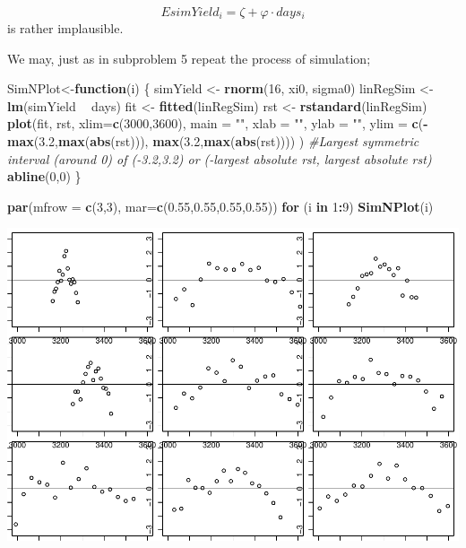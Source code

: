 \documentclass[
]{article}
\newenvironment{Shaded}{\begin{snugshade}}{\end{snugshade}}
\newcommand{\CommentTok}[1]{\textcolor[rgb]{0.56,0.35,0.01}{\textit{#1}}}
\newcommand{\ControlFlowTok}[1]{\textcolor[rgb]{0.13,0.29,0.53}{\textbf{#1}}}
\newcommand{\DataTypeTok}[1]{\textcolor[rgb]{0.13,0.29,0.53}{#1}}
\newcommand{\DecValTok}[1]{\textcolor[rgb]{0.00,0.00,0.81}{#1}}
\newcommand{\FloatTok}[1]{\textcolor[rgb]{0.00,0.00,0.81}{#1}}
\newcommand{\KeywordTok}[1]{\textcolor[rgb]{0.13,0.29,0.53}{\textbf{#1}}}
\newcommand{\NormalTok}[1]{#1}
\newcommand{\OperatorTok}[1]{\textcolor[rgb]{0.81,0.36,0.00}{\textbf{#1}}}
\newcommand{\StringTok}[1]{\textcolor[rgb]{0.31,0.60,0.02}{#1}}
\begin{document}
\[
EsimYield_i=\zeta+\varphi\cdot days_i
\] is rather implausible.

We may, just as in subproblem 5 repeat the process of simulation;

\begin{Shaded}
\begin{Highlighting}[]
\NormalTok{SimNPlot<-}\ControlFlowTok{function}\NormalTok{(i) \{}
\NormalTok{   simYield <-}\StringTok{ }\KeywordTok{rnorm}\NormalTok{(}\DecValTok{16}\NormalTok{, xi0, sigma0)}
\NormalTok{   linRegSim <-}\StringTok{ }\KeywordTok{lm}\NormalTok{(simYield }\OperatorTok{~}\StringTok{ }\NormalTok{days)}
\NormalTok{   fit <-}\StringTok{ }\KeywordTok{fitted}\NormalTok{(linRegSim)}
\NormalTok{   rst <-}\StringTok{ }\KeywordTok{rstandard}\NormalTok{(linRegSim)}
   \KeywordTok{plot}\NormalTok{(fit, rst, }\DataTypeTok{xlim=}\KeywordTok{c}\NormalTok{(}\DecValTok{3000}\NormalTok{,}\DecValTok{3600}\NormalTok{), }\DataTypeTok{main =} \StringTok{""}\NormalTok{, }\DataTypeTok{xlab =} \StringTok{""}\NormalTok{, }\DataTypeTok{ylab =} \StringTok{""}\NormalTok{, }\DataTypeTok{ylim =} \KeywordTok{c}\NormalTok{(}\OperatorTok{-}\KeywordTok{max}\NormalTok{(}\FloatTok{3.2}\NormalTok{,}\KeywordTok{max}\NormalTok{(}\KeywordTok{abs}\NormalTok{(rst))), }\KeywordTok{max}\NormalTok{(}\FloatTok{3.2}\NormalTok{,}\KeywordTok{max}\NormalTok{(}\KeywordTok{abs}\NormalTok{(rst)))) ) }
   \CommentTok{#Largest symmetric interval (around 0) of (-3.2,3.2) or (-largest absolute rst, largest absolute rst)}
   \KeywordTok{abline}\NormalTok{(}\DecValTok{0}\NormalTok{,}\DecValTok{0}\NormalTok{)}
\NormalTok{\}}

\KeywordTok{par}\NormalTok{(}\DataTypeTok{mfrow =} \KeywordTok{c}\NormalTok{(}\DecValTok{3}\NormalTok{,}\DecValTok{3}\NormalTok{), }\DataTypeTok{mar=}\KeywordTok{c}\NormalTok{(}\FloatTok{0.55}\NormalTok{,}\FloatTok{0.55}\NormalTok{,}\FloatTok{0.55}\NormalTok{,}\FloatTok{0.55}\NormalTok{))}
\ControlFlowTok{for}\NormalTok{ (i }\ControlFlowTok{in} \DecValTok{1}\OperatorTok{:}\DecValTok{9}\NormalTok{) }\KeywordTok{SimNPlot}\NormalTok{(i)}
\end{Highlighting}
\end{Shaded}

\begin{center}\includegraphics{matstatproblems20-21_files/figure-latex/unnamed-chunk-63-1} \end{center}
\end{document}
